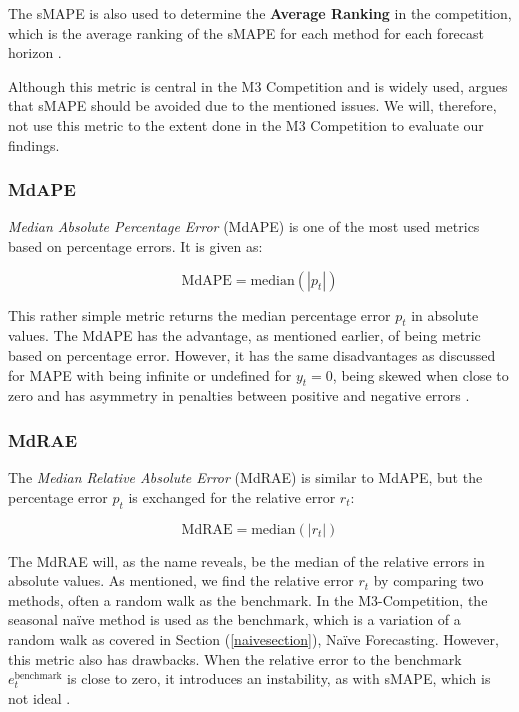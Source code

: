 \documentclass[12pt,a4paper]{article}
\begin{document}
The sMAPE is also used to determine the \textbf{Average Ranking} in the competition, which is the average ranking of the sMAPE for each method for each forecast horizon \parencite{MAKRIDAKIS2000}.

Although this metric is central in the M3 Competition and is widely used, \cite{HyndmanAccuracy2006} argues that sMAPE should be avoided due to the mentioned issues. We will, therefore, not use this metric to the extent done in the M3 Competition to evaluate our findings. 

\subsubsection{MdAPE}

\textit{Median Absolute Percentage Error} (MdAPE) is one of the most used metrics based on percentage errors. It is given as: 

\begin{equation}
  \text{MdAPE} = \text{median} \left( \left| p_t \right| \right)
\end{equation}

This rather simple metric returns the median percentage error $p_t$ in absolute values. The MdAPE has the advantage, as mentioned earlier, of being metric based on percentage error. However, it has the same disadvantages as discussed for MAPE with being infinite or undefined for $y_t = 0$, being skewed when close to zero and has asymmetry in penalties between positive and negative errors \parencite[683]{HyndmanAccuracy2006}. 

\subsubsection{MdRAE}

The \textit{Median Relative Absolute Error} (MdRAE) is similar to MdAPE, but the percentage error $p_t$ is exchanged for the relative error $r_t$:

\begin{equation}
  \text{MdRAE} = \text{median} \left( \left| r_t \right| \right)
\end{equation}

The MdRAE will, as the name reveals, be the median of the relative errors in absolute values. As mentioned, we find the relative error $r_t$ by comparing two methods, often a random walk as the benchmark. In the M3-Competition, the seasonal naïve method is used as the benchmark, which is a variation of a random walk as covered in Section (\ref{naivesection}), Naïve Forecasting. However, this metric also has drawbacks. When the relative error to the benchmark ${e_t^{\text{benchmark}}}$ is close to zero, it introduces an instability, as with sMAPE, which is not ideal \parencite[683]{HyndmanAccuracy2006}. 
\end{document}
